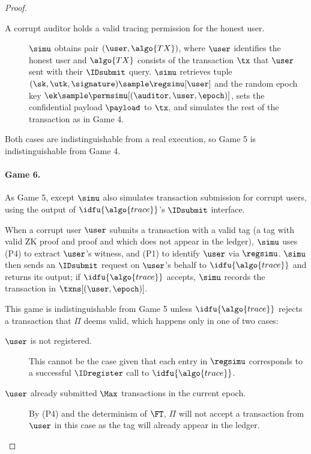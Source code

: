 \begin{proof}
\begin{description}
    \item[A corrupt auditor holds a valid tracing permission for the honest
      user.] $\simu$ obtains pair $(\user, \algo{TX})$, where $\user$
      identifies the honest user and $\algo{TX}$ consists of the transaction
      $\tx$ that $\user$ sent with their $\IDsubmit$ query. $\simu$ retrieves
      tuple $(\sk, \utk,\signature) \sample \regsimu[\user]$ and the random
      epoch key $\ek \sample \permsimu[(\auditor,\user,\epoch)]$, sets the
      confidential payload $\payload$ to $\tx$, and simulates the rest of the
      transaction as in Game 4.

  \end{description}

  Both cases are indistinguishable from a real execution, so Game 5 is
  indistinguishable from Game 4.

  \paragraph{Game 6.} As Game 5, except $\simu$ also simulates transaction
  submission for corrupt users, using the output of $\idfu{\algo{trace}}$'s
  $\IDsubmit$ interface.

  When a corrupt user $\user$ submits a transaction with a valid tag (a tag
  with valid ZK proof and proof and which does not appear in the ledger),
  $\simu$ uses (P4) to extract $\user$'s witness, and (P1) to identify $\user$ via
  $\regsimu$. $\simu$ then sends an $\IDsubmit$ request on $\user$'s behalf to
  $\idfu{\algo{trace}}$ and returns its output; if $\idfu{\algo{trace}}$
  accepts, $\simu$ records the transaction in $\txns[(\user,\epoch)]$.

  This game is indistinguishable from Game 5 unless $\idfu{\algo{trace}}$
  rejects a transaction that $\Pi$ deems valid, which happens only in one of
  two cases:

  \begin{description}

    \item[$\user$ is not registered.] This cannot be the case given that each
      entry in $\regsimu$ corresponds to a successful $\IDregister$ call to
      $\idfu{\algo{trace}}$.

    \item[$\user$ already submitted $\Max$ transactions in the current epoch.]
      By (P4) and the determinism of $\FT$, $\Pi$ will not accept a
      transaction from $\user$ in this case as the tag will already appear in
      the ledger.


\end{description}
\end{proof}
